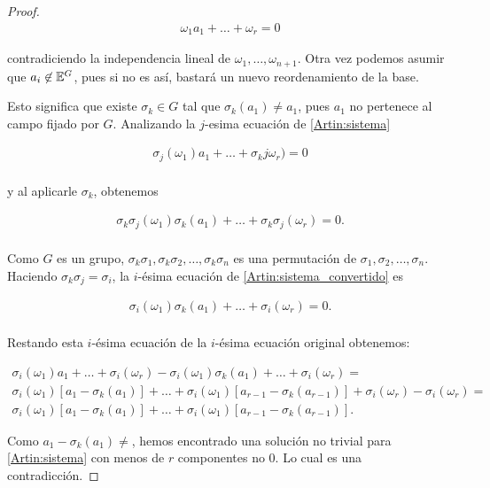 \begin{proof}
    \begin{align}
        \omega_1 a_1   +   \dots + \omega_r  =   0
    \end{align}
    
    contradiciendo la independencia lineal de $\omega_1, \dots, \omega_{n+1}$. Otra vez podemos asumir que $a_i \not\in \mathbb{E}^G$,
    pues si no es así, bastará un nuevo reordenamiento de la base.\par\null
    
    Esto significa que existe $\sigma_k \in G$ tal que $\sigma_k(a_1) \not= a_1$, pues $a_1$ no pertenece al campo fijado por $G$.
    Analizando la $j$-esima ecuación de \eqref{Artin:sistema}
    
    \begin{align}
        \sigma_j(\omega_1)a_1   +   \dots   +   \sigma_kj\omega_{r})   =   0                                    \\
    \end{align}
    
    y al aplicarle $\sigma_k$, obtenemos
        
    \begin{align} \label{Artin:sistema_convertido}
        \sigma_k\sigma_j(\omega_1)\sigma_k(a_1)   +   \dots   +   \sigma_k\sigma_j(\omega_{r})   =   0.         \\
    \end{align}\par\null
    
    Como $G$ es un grupo, $\sigma_k\sigma_1, \sigma_k\sigma_2, \dots, \sigma_k\sigma_n$ es una permutación de
    $\sigma_1, \sigma_2, \dots, \sigma_n$. Haciendo $\sigma_k \sigma_j = \sigma_i$, la $i$-ésima ecuación de \eqref{Artin:sistema_convertido}
    es
    
    \begin{align}
        \sigma_i(\omega_1)\sigma_k(a_1)   +   \dots   +   \sigma_i(\omega_{r})   =   0.                         \\
    \end{align}
    
    Restando esta $i$-ésima ecuación de la $i$-ésima ecuación original obtenemos:
    
    \begin{align}
        \sigma_i(\omega_1) a_1   +   \dots   +   \sigma_i(\omega_{r}) - \sigma_i(\omega_1)\sigma_k(a_1)   +   \dots   +   \sigma_i(\omega_{r})                  =\\
        \sigma_i(\omega_1) [a_1 - \sigma_k(a_1)]   +   \dots   +  \sigma_i(\omega_1) [a_{r-1} - \sigma_k(a_{r-1})] + \sigma_i(\omega_{r}) - \sigma_i(\omega_{r})=\\
        \sigma_i(\omega_1) [a_1 - \sigma_k(a_1)]   +   \dots   +  \sigma_i(\omega_1) [a_{r-1} - \sigma_k(a_{r-1})].  
    \end{align}
    
    Como $a_1 - \sigma_k(a_1) \not=$, hemos encontrado una solución no trivial para \eqref{Artin:sistema} con menos de $r$ componentes no $0$. Lo cual
    es una contradicción.
\end{proof}